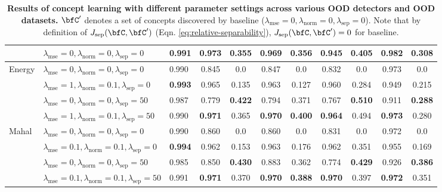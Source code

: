 \begin{table}[tb]
\begin{adjustbox}{width=2\columnwidth,center}
\begin{tabular}{l|l|l|c|c|c|c|c|c|c|c}
			& $\lambda_\textrm{mse} = 0, \lambda_\textrm{norm} = 0, \lambda_\textrm{sep} = 0$ & 0.991 & \textbf{0.973} & 0.355 & \textbf{0.969} & \textbf{0.356} & \textbf{0.945} & 0.405 & \textbf{0.982} & 0.308 \\ \hline
			\multirow{4}{0.10\linewidth}{Energy} 
			& $\lambda_\textrm{mse} = 0, \lambda_\textrm{norm} = 0, \lambda_\textrm{sep} = 0$ & 0.990 & 0.845 & 0.0 & 0.847 & 0.0 & 0.832 & 0.0 & 0.973 & 0.0\\
			& $\lambda_\textrm{mse} = 1, \lambda_\textrm{norm} = 0.1, \lambda_\textrm{sep} = 0$ & \textbf{0.993} & 0.965 & 0.135 & 0.963 & 0.127 & 0.960 & 0.284 & 0.949 & 0.215\\
			& $\lambda_\textrm{mse} = 0, \lambda_\textrm{norm} = 0, \lambda_\textrm{sep} = 50$ & 0.987 & 0.779 & \textbf{0.422} & 0.794 & 0.371 & 0.767 & \textbf{0.510} & 0.911 & \textbf{0.288} \\
			& $\lambda_\textrm{mse} = 1, \lambda_\textrm{norm} = 0.1, \lambda_\textrm{sep} = 50$ & 0.990 & \textbf{0.971} & 0.365 & \textbf{0.970} & \textbf{0.400} & \textbf{0.964} & 0.494 & \textbf{0.973} & 0.280\\ \hline
			\multirow{4}{0.10\linewidth}{Mahal} 
			& $\lambda_\textrm{mse} = 0, \lambda_\textrm{norm} = 0, \lambda_\textrm{sep} = 0$ & 0.990 & 0.860 & 0.0 & 0.860 & 0.0 & 0.831 & 0.0 & 0.972 & 0.0 \\
			& $\lambda_\textrm{mse} = 0.1, \lambda_\textrm{norm} = 0.1, \lambda_\textrm{sep} = 0$ & \textbf{0.994} & 0.962 & 0.153 & 0.963 & 0.176 & 0.962 & 0.351 & 0.955 & 0.169\\
			& $\lambda_\textrm{mse} = 0, \lambda_\textrm{norm} = 0, \lambda_\textrm{sep} = 50$ & 0.985 & 0.850 & \textbf{0.430} & 0.883 & 0.362 & 0.774 & \textbf{0.429} & 0.926 & \textbf{0.386} \\
			& $\lambda_\textrm{mse} = 0.1, \lambda_\textrm{norm} = 0.1, \lambda_\textrm{sep} = 50$ & 0.991 & \textbf{0.971} & 0.370 & \textbf{0.970} & \textbf{0.388} & \textbf{0.970} & 0.397 & \textbf{0.972} & 0.351 \\ \bottomrule
		\end{tabular}
	\end{adjustbox}
	\caption[]{\small \textbf{Results of concept learning with different parameter settings across various OOD detectors and OOD datasets.} $\bfC'$ denotes a set of concepts discovered by baseline \cite{yeh2019completeness} (\ie $\lambda_\textrm{mse} = 0, \lambda_\textrm{norm} = 0, \lambda_\textrm{sep} = 0$).
	Note that by definition of $J_{\textrm{sep}}(\bfC, \bfC')$ (Eqn. \ref{eq:relative-separability}), $J_{\textrm{sep}}(\bfC, \bfC') = 0$ for baseline.
}
\end{table}

